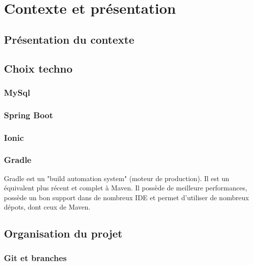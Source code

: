 \chapter{Contexte et présentation}
	\section{Présentation du contexte}

	\section{Choix techno}


		\subsection{MySql}

		\subsection{Spring Boot}

		\subsection{Ionic}

		\subsection{Gradle}
			Gradle est un "build automation system" (moteur de production). Il est un équivalent plus récent et complet à Maven. Il possède de meilleure performances, possède un bon support dans de nombreux IDE et permet d'utiliser de nombreux dépots, dont ceux de Maven.

	\section{Organisation du projet}
		\subsection{Git et branches}
